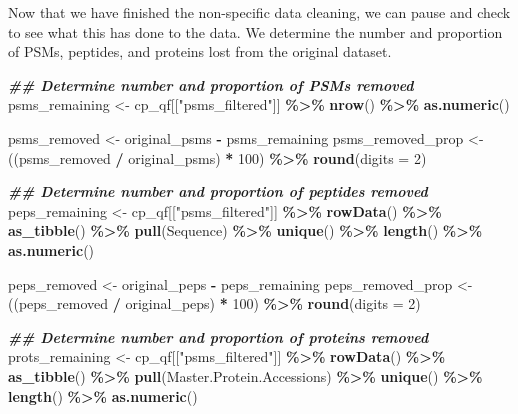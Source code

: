 \documentclass[9pt,a4paper,]{extarticle}
\newenvironment{Shaded}{\begin{snugshade}}{\end{snugshade}}
\newcommand{\AttributeTok}[1]{\textcolor[rgb]{0.13,0.29,0.53}{#1}}
\newcommand{\DecValTok}[1]{\textcolor[rgb]{0.00,0.00,0.81}{#1}}
\newcommand{\DocumentationTok}[1]{\textcolor[rgb]{0.56,0.35,0.01}{\textbf{\textit{#1}}}}
\newcommand{\FunctionTok}[1]{\textcolor[rgb]{0.13,0.29,0.53}{\textbf{#1}}}
\newcommand{\NormalTok}[1]{#1}
\newcommand{\OtherTok}[1]{\textcolor[rgb]{0.56,0.35,0.01}{#1}}
\newcommand{\SpecialCharTok}[1]{\textcolor[rgb]{0.81,0.36,0.00}{\textbf{#1}}}
\newcommand{\StringTok}[1]{\textcolor[rgb]{0.31,0.60,0.02}{#1}}
\begin{document}
Now that we have finished the non-specific data cleaning, we can pause and check
to see what this has done to the data. We determine the number and proportion of
PSMs, peptides, and proteins lost from the original dataset.

\begin{Shaded}
\begin{Highlighting}[]
\DocumentationTok{\#\# Determine number and proportion of PSMs removed}
\NormalTok{psms\_remaining }\OtherTok{\textless{}{-}}\NormalTok{ cp\_qf[[}\StringTok{"psms\_filtered"}\NormalTok{]] }\SpecialCharTok{\%\textgreater{}\%}
  \FunctionTok{nrow}\NormalTok{() }\SpecialCharTok{\%\textgreater{}\%}
  \FunctionTok{as.numeric}\NormalTok{()}

\NormalTok{psms\_removed }\OtherTok{\textless{}{-}}\NormalTok{ original\_psms }\SpecialCharTok{{-}}\NormalTok{ psms\_remaining}
\NormalTok{psms\_removed\_prop }\OtherTok{\textless{}{-}}\NormalTok{ ((psms\_removed }\SpecialCharTok{/}\NormalTok{ original\_psms) }\SpecialCharTok{*} \DecValTok{100}\NormalTok{) }\SpecialCharTok{\%\textgreater{}\%}
  \FunctionTok{round}\NormalTok{(}\AttributeTok{digits =} \DecValTok{2}\NormalTok{)}

\DocumentationTok{\#\# Determine number and proportion of peptides removed}
\NormalTok{peps\_remaining }\OtherTok{\textless{}{-}}\NormalTok{ cp\_qf[[}\StringTok{"psms\_filtered"}\NormalTok{]] }\SpecialCharTok{\%\textgreater{}\%}
  \FunctionTok{rowData}\NormalTok{() }\SpecialCharTok{\%\textgreater{}\%} 
  \FunctionTok{as\_tibble}\NormalTok{() }\SpecialCharTok{\%\textgreater{}\%} 
  \FunctionTok{pull}\NormalTok{(Sequence) }\SpecialCharTok{\%\textgreater{}\%} 
  \FunctionTok{unique}\NormalTok{() }\SpecialCharTok{\%\textgreater{}\%}
  \FunctionTok{length}\NormalTok{() }\SpecialCharTok{\%\textgreater{}\%}
  \FunctionTok{as.numeric}\NormalTok{()}

\NormalTok{peps\_removed }\OtherTok{\textless{}{-}}\NormalTok{ original\_peps }\SpecialCharTok{{-}}\NormalTok{ peps\_remaining}
\NormalTok{peps\_removed\_prop }\OtherTok{\textless{}{-}}\NormalTok{ ((peps\_removed }\SpecialCharTok{/}\NormalTok{ original\_peps) }\SpecialCharTok{*} \DecValTok{100}\NormalTok{) }\SpecialCharTok{\%\textgreater{}\%}
  \FunctionTok{round}\NormalTok{(}\AttributeTok{digits =} \DecValTok{2}\NormalTok{)}

\DocumentationTok{\#\# Determine number and proportion of proteins removed}
\NormalTok{prots\_remaining }\OtherTok{\textless{}{-}}\NormalTok{ cp\_qf[[}\StringTok{"psms\_filtered"}\NormalTok{]] }\SpecialCharTok{\%\textgreater{}\%} 
  \FunctionTok{rowData}\NormalTok{() }\SpecialCharTok{\%\textgreater{}\%} 
  \FunctionTok{as\_tibble}\NormalTok{() }\SpecialCharTok{\%\textgreater{}\%} 
  \FunctionTok{pull}\NormalTok{(Master.Protein.Accessions) }\SpecialCharTok{\%\textgreater{}\%} 
  \FunctionTok{unique}\NormalTok{() }\SpecialCharTok{\%\textgreater{}\%}
  \FunctionTok{length}\NormalTok{() }\SpecialCharTok{\%\textgreater{}\%}
  \FunctionTok{as.numeric}\NormalTok{() }


\end{Highlighting}
\end{Shaded}
\end{document}
